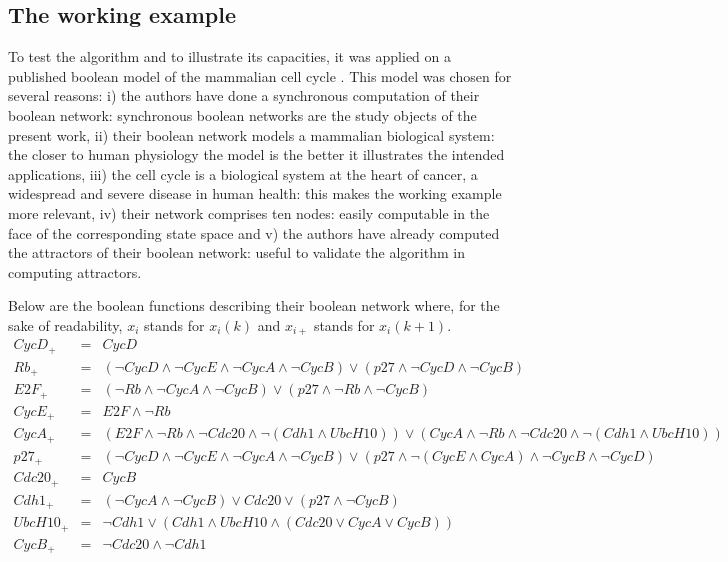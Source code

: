 \documentclass[oneside,a4paper,onecolumn,notitlepage]{article}
\begin{document}
\subsection*{The working example}
To test the algorithm and to illustrate its capacities, it was applied on a published boolean model of the mammalian cell cycle \cite{faure2006dynamical}. This model was chosen for several reasons: i) the authors have done a synchronous computation of their boolean network: synchronous boolean networks are the study objects of the present work, ii) their boolean network models a mammalian biological system: the closer to human physiology the model is the better it illustrates the intended applications, iii) the cell cycle is a biological system at the heart of cancer, a widespread and severe disease in human health: this makes the working example more relevant, iv) their network comprises ten nodes: easily computable in the face of the corresponding state space and v) the authors have already computed the attractors of their boolean network: useful to validate the algorithm in computing attractors.

Below are the boolean functions describing their boolean network where, for the sake of readability, $x_i$ stands for $x_{i}(k)$ and $x_{i+}$ stands for $x_{i}(k+1)$.
{\tiny
\begin{eqnarray*}
CycD_{+}&=&CycD\\
Rb_{+}&=&(\lnot CycD \land \lnot CycE \land \lnot CycA \land \lnot CycB) \lor (p27 \land \lnot CycD \land \lnot CycB)\\
E2F_{+}&=&(\lnot Rb \land \lnot CycA \land \lnot CycB) \lor (p27 \land \lnot Rb \land \lnot CycB)\\
CycE_{+}&=&E2F \land \lnot Rb\\
CycA_{+}&=&(E2F \land \lnot Rb \land \lnot Cdc20 \land \lnot(Cdh1 \land UbcH10)) \lor (CycA \land \lnot Rb \land \lnot Cdc20 \land \lnot(Cdh1 \land UbcH10))\\
p27_{+}&=&(\lnot CycD \land \lnot CycE \land \lnot CycA \land \lnot CycB) \lor (p27 \land \lnot(CycE \land CycA) \land \lnot CycB \land \lnot CycD)\\
Cdc20_{+}&=&CycB\\
Cdh1_{+}&=&(\lnot CycA \land \lnot CycB) \lor Cdc20 \lor (p27 \land \lnot CycB)\\
UbcH10_{+}&=&\lnot Cdh1 \lor (Cdh1 \land UbcH10 \land (Cdc20 \lor CycA \lor CycB))\\
CycB_{+}&=&\lnot Cdc20 \land \lnot Cdh1
\end{eqnarray*}
}
\end{document}
